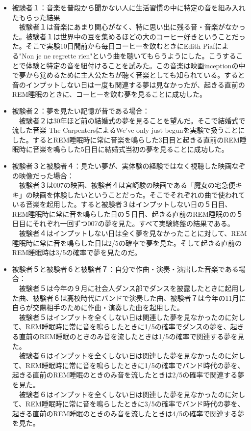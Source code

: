 \begin{itemize}
\item 被験者１：音楽を普段から聞かない人に生活習慣の中に特定の音を組み入れたもらった結果\\
　被験者１は音楽にあまり関心がなく、特に思い出に残る音・音楽がなかった。被験者１は世界中の豆を集めるほどの大のコーヒー好きということだった。そこで実験10日間前から毎日コーヒーを飲むときにEdith Piafによる"Non je ne regrette rien"という曲を聴いてもらうようにした。こうすることで体験と特定の音を紐付けることを試みた。この音楽は映画inceptionの中で夢から覚めるために主人公たちが聴く音楽としても知られている。すると音のインプットしない日は一度も関連する夢は見なかったが、起きる直前のREM睡眠のときに、コーヒーを飲む夢を見ることに成功した。

\item 被験者２：夢を見たい記憶が昔である場合：\\
　被験者２は30年ほど前の結婚式の夢を見ることを望んだ。そこで結婚式で流した音楽 The CarpentersによるWe've only just begunを実験で扱うことにした。するとREM睡眠時に常に音楽を鳴らした3日目と起きる直前のREM睡眠時に音楽を鳴らした5日目に結婚式当初の夢を見ることに成功した。

\item 被験者３と被験者４：見たい夢が、実体験の経験ではなく視聴した映画なぞの映像だった場合：\\
　被験者３は007の映画、被験者４は宮崎駿の映画である「魔女の宅急便キキ」の映画を体験したいということだった。そこでそれぞれの曲で使われている音楽を起用した。すると被験者３はインプットしない日の５日目、REM睡眠時に常に音を鳴らした日の５日目、起きる直前のREM睡眠のの５日目にそれぞれ一回ずつ007の夢を見た。すべて実験終盤の結果である。\\
　被験者４はインプットしない日は全く夢を見なかったことに対して、REM睡眠時に常に音を鳴らした日は2/5の確率で夢を見た。そして起きる直前のREM睡眠時は3/5の確率で夢を見たのだ。

\item 被験者５と被験者６と被験者７：自分で作曲・演奏・演出した音楽である場合：\\
　被験者５は今年の９月に社会人ダンス部でダンスを披露したときに起用した曲、被験者６は高校時代にバンドで演奏した曲、被験者７は今年の11月に自らが交際相手のために作曲・演奏した曲を起用した。\\
　被験者５はインプットを全くしない日は関連した夢を見なかったのに対して、REM睡眠時に常に音を鳴らしたときに1/5の確率でダンスの夢を、起きる直前のREM睡眠のときのみ音を流したときは1/5の確率で関連する夢を見た。\\
　被験者６はインプットを全くしない日は関連した夢を見なかったのに対して、REM睡眠時に常に音を鳴らしたときに1/5の確率でバンド時代の夢を、起きる直前のREM睡眠のときのみ音を流したときは2/5の確率で関連する夢を見た。\\
　被験者６はインプットを全くしない日は関連した夢を見なかったのに対して、REM睡眠時に常に音を鳴らしたときに3/5の確率でバンド時代の夢を、起きる直前のREM睡眠のときのみ音を流したときは4/5の確率で関連する夢を見た。
\end{itemize}

